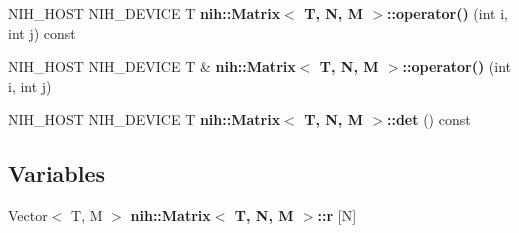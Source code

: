 \begin{DoxyCompactItemize}
\item 
\hypertarget{group__linalg_gae6ddc1c3fb0eb0318233f95e7d382894}{
\-N\-I\-H\-\_\-\-H\-O\-S\-T \-N\-I\-H\-\_\-\-D\-E\-V\-I\-C\-E \-T {\bfseries nih\-::\-Matrix$<$ T, N, M $>$\-::operator()} (int i, int j) const }
\label{group__linalg_gae6ddc1c3fb0eb0318233f95e7d382894}

\item 
\hypertarget{group__linalg_gaf4a309500232a6e6663faa045fe258d7}{
\-N\-I\-H\-\_\-\-H\-O\-S\-T \-N\-I\-H\-\_\-\-D\-E\-V\-I\-C\-E \-T \& {\bfseries nih\-::\-Matrix$<$ T, N, M $>$\-::operator()} (int i, int j)}
\label{group__linalg_gaf4a309500232a6e6663faa045fe258d7}

\item 
\hypertarget{group__linalg_ga20d0e32d5bf4cbea9002479abf0d034b}{
\-N\-I\-H\-\_\-\-H\-O\-S\-T \-N\-I\-H\-\_\-\-D\-E\-V\-I\-C\-E \-T {\bfseries nih\-::\-Matrix$<$ T, N, M $>$\-::det} () const }
\label{group__linalg_ga20d0e32d5bf4cbea9002479abf0d034b}

\end{DoxyCompactItemize}
\subsection*{\-Variables}
\begin{DoxyCompactItemize}
\item 
\hypertarget{group__linalg_ga412525ee29436819434578b8dbd60a1e}{
\-Vector$<$ \-T, \-M $>$ {\bfseries nih\-::\-Matrix$<$ T, N, M $>$\-::r} \mbox{[}\-N\mbox{]}}
\label{group__linalg_ga412525ee29436819434578b8dbd60a1e}

\end{DoxyCompactItemize}
